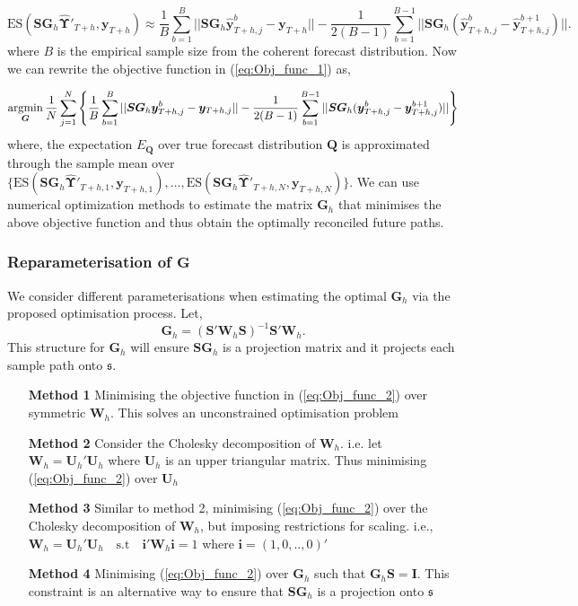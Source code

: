 \documentclass[12pt]{article}
\theoremstyle{definition}
\begin{document}
\begin{equation}\label{eq:ES_with_Samplespaths}
\text{ES}(\bm{SG}_h\hat{\bm{\Upsilon}}'_{T+h}, \bm{y}_{T+h}) \approx \frac{1}{B}\sum_{b=1}^{B}||\bm{SG}_h\hat{\bm{y}}_{T+h,j}^b -\bm{y}_{T+h}||-\frac{1}{2(B-1)}\sum_{b=1}^{B-1}||\bm{SG}_h(\hat{\bm{y}}_{T+h,j}^b -\hat{\bm{y}}_{T+h,j}^{b+1})||.
\end{equation}
where $B$ is the empirical sample size from the coherent forecast distribution. Now we can rewrite the objective function in (\ref{eq:Obj_func_1}) as,

\begin{equation}\label{eq:Obj_func_2}
\operatornamewithlimits{argmin}_{\bm{G}} \frac{1}{N}\sum_{j=1}^{N}\left\{\frac{1}{B}\sum_{b=1}^{B}||\bm{SG}_h\bm{y}_{T+h,j}^b -\bm{y}_{T+h,j}||-\frac{1}{2(B-1)}\sum_{b=1}^{B-1}||\bm{SG}_h(\bm{y}_{T+h,j}^b -\bm{y}_{T+h,j}^{b+1})||\right\}
\end{equation}
where, the expectation $E_{\bm{Q}}$ over true forecast distribution $\bm{Q}$ is approximated through the sample mean over $\{\text{ES}(\bm{SG}_h\hat{\bm{\Upsilon}}'_{T+h,1}, \bm{y}_{T+h,1}),\dots,\text{ES}(\bm{SG}_h\hat{\bm{\Upsilon}}'_{T+h,N}, \bm{y}_{T+h,N})\}$.
We can use numerical optimization methods to estimate the matrix $\bm{G}_h$ that minimises the above objective function and thus obtain the optimally reconciled future paths.

\subsubsection{Reparameterisation of $\bm{G}$ }\label{subsubsec:ReparameterisationG}

We consider different parameterisations when estimating the optimal $\bm{G}_h$ via the proposed optimisation process. Let,
\begin{equation}\label{eq:StructureofG}
\bm{G}_h = (\bm{S'W}_h\bm{S})^{-1}\bm{S'W}_h.
\end{equation}
This structure for $\bm{G}_h$ will ensure $\bm{SG}_h$ is a projection matrix and it projects each sample path onto $\mathfrak{s}$.
\begin{itemize}
	\item[\textbf{Method 1}] Minimising the objective function in (\ref{eq:Obj_func_2}) over symmetric $\bm{W}_h$. This solves an unconstrained optimisation problem
	\item[\textbf{Method 2}] Consider the Cholesky decomposition of $\bm{W}_h$. i.e. let $\bm{W}_h = \bm{U}_h'\bm{U}_h$ where $\bm{U}_h$ is an upper triangular matrix. Thus minimising (\ref{eq:Obj_func_2}) over $\bm{U}_h$
	\item[\textbf{Method 3}] Similar to method 2, minimising (\ref{eq:Obj_func_2}) over the Cholesky decomposition of $\bm{W}_h$, but imposing restrictions for scaling. i.e., $\bm{W}_h=\bm{U}_h'\bm{U}_h \quad \text{s.t} \quad \bm{i'}\bm{W}_h\bm{i}=1$ where $\bm{i}=(1,0,..,0)'$
	\item[\textbf{Method 4}] Minimising (\ref{eq:Obj_func_2}) over $\bm{G}_h$ such that $\bm{G}_h\bm{S}=\bm{I}$. This constraint is an alternative way to ensure that $\bm{SG}_h$ is a projection onto $\mathfrak{s}$
	
\end{itemize}
\end{document}
